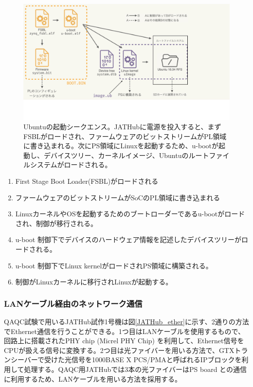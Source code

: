 \begin{figure} 
\centering
\includegraphics[width=12cm]{fig/QAQC/JATHubboot.pdf}
\caption[Ubuntuの起動シークエンス]{Ubuntuの起動シークエンス\cite{mt_okazaki}。JATHubに電源を投入すると、まずFSBLがロードされ、ファームウェアのビットストリームがPL領域に書き込まれる。次にPS領域にLinuxを起動するため、u-bootが起動し、デバイスツリー、カーネルイメージ、Ubuntuのルートファイルシステムがロードされる。}
\label{JATHubboot}
\end{figure}

\begin{enumerate}
    \item First Stage Boot Loader(FSBL)がロードされる
    \item ファームウェアのビットストリームがSoCのPL領域に書き込まれる
    \item LinuxカーネルやOSを起動するためのブートローダーであるu-bootがロードされ、制御が移行される。
    \item u-boot 制御下でデバイスのハードウェア情報を記述したデバイスツリーがロードされる。
    \item u-boot 制御下でLinux kernelがロードされPS領域に構築される。
    \item 制御がLinuxカーネルに移行されLinuxが起動する。
\end{enumerate}

\subsubsection{LANケーブル経由のネットワーク通信}
\baselineskip
\label{subsubsec_network}
QAQC試験で用いるJATHub試作1号機は図\ref{JATHub_ether}に示す、2通りの方法でEthernet通信を行うことができる。1つ目はLANケーブルを使用するもので、回路上に搭載されたPHY chip (Micrel PHY Chip) を利用して、Ethernet信号をCPUが扱える信号に変換する。2つ目は光ファイバーを用いる方法で、GTXトランシーバーで受けた光信号を1000BASE X PCS/PMAと呼ばれるIPブロックを利用して処理する。QAQC用JATHubでは3本の光ファイバーはPS board との通信に利用するため、LANケーブルを用いる方法を採用する。

